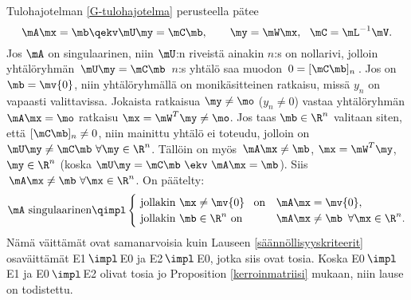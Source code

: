 Tulohajotelman \eqref{G-tulohajotelma} perusteella pätee
\[
\mA\mx=\mb \qekv \mU\my=\mC\mb, \qquad \my=\mW\mx,\ \ \mC=\mL^{-1}\mV.
\]
Jos $\mA$ on singulaarinen, niin $\mU$:n riveistä ainakin $n$:s on nollarivi, jolloin 
yhtälöryhmän $\,\mU\my=\mC\mb\,$ $n$:s yhtälö saa muodon $\,0=[\mC\mb]_n\,$. Jos on
$\mb=\mv{0}$, niin yhtälöryhmällä on monikäsitteinen ratkaisu, missä $y_n$ on vapaasti
valittavissa. Jokaista ratkaisua $\my\neq\mo$ ($y_n \neq 0$) vastaa yhtälöryhmän $\mA\mx=\mo$
ratkaisu $\mx=\mW^T\my\neq\mo$. Jos taas $\mb\in\R^n$ valitaan siten, että $[\mC\mb]_n \neq 0$,
niin mainittu yhtälö ei toteudu, jolloin on $\mU\my\neq\mC\mb\ \forall\my\in\R^n$. Tällöin on
myös $\,\mA\mx\neq\mb$, $\mx=\mW^T\my$, $\my\in\R^n$ (koska $\mU\my=\mC\mb\ \ekv\ \mA\mx=\mb$).
Siis $\,\mA\mx\neq\mb\ \forall\mx\in\R^n$. On päätelty:
\[
\mA\ \text{singulaarinen} 
       \qimpl \begin{cases} 
               \text{\ jollakin $\mx\neq\mv{0}$\,\ \ on} &\mA\mx=\mv{0}, \\
               \text{\ jollakin $\mb\in\R^n$ on}\        &\mA\mx\neq\mb\,\ \forall \mx\in\R^n.
               \end{cases}
\]
Nämä väittämät ovat samanarvoisia kuin Lauseen \ref{säännöllisyyskriteerit} osaväittämät 
E1$\,\impl\,$E0 ja E2$\,\impl\,$E0, jotka siis ovat tosia. Koska E0$\,\impl\,$E1 ja
E0$\,\impl\,$E2 olivat tosia jo Proposition \ref{kerroinmatriisi} mukaan, niin lause on
todistettu. \loppu

\pagebreak

